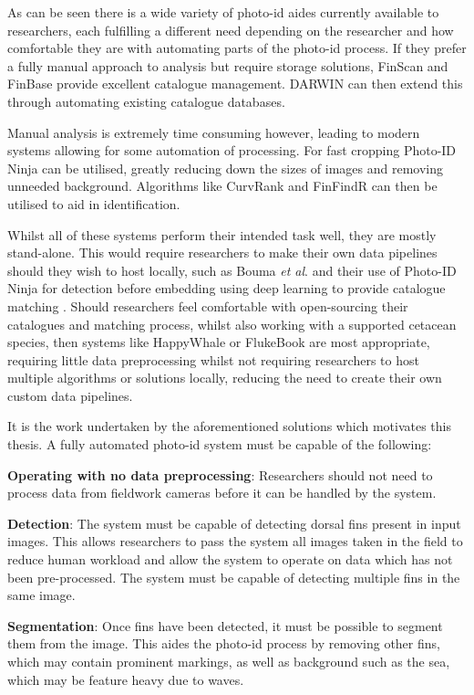 As can be seen there is a wide variety of photo-id aides currently available to researchers, each fulfilling a different need depending on the researcher and how comfortable they are with automating parts of the photo-id process. If they prefer a fully manual approach to analysis but require storage solutions, FinScan and FinBase provide excellent catalogue management. DARWIN can then extend this through automating existing catalogue databases. 

Manual analysis is extremely time consuming however, leading to modern systems allowing for some automation of processing. For fast cropping Photo-ID Ninja can be utilised, greatly reducing down the sizes of images and removing unneeded background. Algorithms like CurvRank and FinFindR can then be utilised to aid in identification. 

Whilst all of these systems perform their intended task well, they are mostly stand-alone. This would require researchers to make their own data pipelines should they wish to host locally, such as Bouma \textit{et al}. and their use of Photo-ID Ninja for detection before embedding using deep learning to provide catalogue matching \cite{bouma_individual_2018}. Should researchers feel comfortable with open-sourcing their catalogues and matching process, whilst also working with a supported cetacean species, then systems like HappyWhale or FlukeBook are most appropriate, requiring little data preprocessing whilst not requiring researchers to host multiple algorithms or solutions locally, reducing the need to create their own custom data pipelines. 

It is the work undertaken by the aforementioned solutions which motivates this thesis. A fully automated photo-id system must be capable of the following:

\textbf{Operating with no data preprocessing}: Researchers should not need to process data from fieldwork cameras before it can be handled by the system. 

\textbf{Detection}: The system must be capable of detecting dorsal fins present in input images. This allows researchers to pass the system all images taken in the field to reduce human workload and allow the system to operate on data which has not been pre-processed. The system must be capable of detecting multiple fins in the same image.

\textbf{Segmentation}: Once fins have been detected, it must be possible to segment them from the image. This aides the photo-id process by removing other fins, which may contain prominent markings, as well as background such as the sea, which may be feature heavy due to waves.

